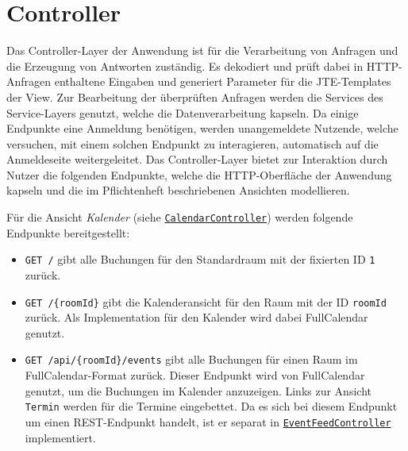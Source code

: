 
\chapter{Controller}
\label{ch:controller}

Das Controller-Layer der Anwendung ist für die Verarbeitung von Anfragen und die Erzeugung von Antworten zuständig.
Es dekodiert und prüft dabei in \gls{HTTP}-Anfragen enthaltene Eingaben und generiert Parameter für die \gls{JTE}-Templates der View.
Zur Bearbeitung der überprüften Anfragen werden die Services des Service-Layers genutzt, welche die Datenverarbeitung kapseln.
Da einige Endpunkte eine Anmeldung benötigen, werden unangemeldete Nutzende, welche versuchen, mit einem solchen Endpunkt zu interagieren, automatisch auf die Anmeldeseite weitergeleitet.
Das Controller-Layer bietet zur Interaktion durch Nutzer die folgenden Endpunkte, welche die \gls{HTTP}-Oberfläche der Anwendung kapseln und die im Pflichtenheft beschriebenen Ansichten modellieren.


Für die Ansicht \textit{Kalender} (siehe \hyperref[edu.kit.hci.soli.controller.CalendarController]{\texttt{CalendarController}}) werden folgende Endpunkte bereitgestellt:
\begin{itemize}
    \item \texttt{GET /} gibt alle Buchungen für den Standardraum mit der fixierten ID \texttt{1} zurück.
    \item \texttt{GET /\{roomId\}} gibt die Kalenderansicht für den Raum mit der ID \texttt{roomId} zurück.
          Als Implementation für den Kalender wird dabei \gls{FullCalendar} genutzt.
    \item \texttt{GET /api/\{roomId\}/events} gibt alle Buchungen für einen Raum im \gls{FullCalendar}-Format zurück.
          Dieser Endpunkt wird von \gls{FullCalendar} genutzt, um die Buchungen im Kalender anzuzeigen.
          Links zur Ansicht \texttt{Termin} werden für die Termine eingebettet.
          Da es sich bei diesem Endpunkt um einen \gls{REST}-Endpunkt handelt, ist er separat in \hyperref[edu.kit.hci.soli.controller.EventFeedController]{\texttt{EventFeedController}} implementiert.
\end{itemize}

